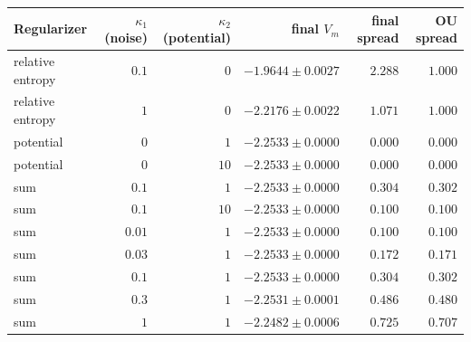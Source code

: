 \begin{tabular}{lrrrrr}
\toprule
Regularizer & $\kappa_1$ (noise) & $\kappa_2$ (potential) & final $V_m$ & final spread & OU spread \\
\midrule
relative entropy & $0.1$ & $0$ & $-1.9644\pm0.0027$ & $2.288$ & $1.000$ \\
relative entropy & $1$ & $0$ & $-2.2176\pm0.0022$ & $1.071$ & $1.000$ \\
potential & $0$ & $1$ & $-2.2533\pm0.0000$ & $0.000$ & $0.000$ \\
potential & $0$ & $10$ & $-2.2533\pm0.0000$ & $0.000$ & $0.000$ \\
sum & $0.1$ & $1$ & $-2.2533\pm0.0000$ & $0.304$ & $0.302$ \\
sum & $0.1$ & $10$ & $-2.2533\pm0.0000$ & $0.100$ & $0.100$ \\
\midrule
sum & $0.01$ & $1$ & $-2.2533\pm0.0000$ & $0.100$ & $0.100$ \\
sum & $0.03$ & $1$ & $-2.2533\pm0.0000$ & $0.172$ & $0.171$ \\
sum & $0.1$ & $1$ & $-2.2533\pm0.0000$ & $0.304$ & $0.302$ \\
sum & $0.3$ & $1$ & $-2.2531\pm0.0001$ & $0.486$ & $0.480$ \\
sum & $1$ & $1$ & $-2.2482\pm0.0006$ & $0.725$ & $0.707$ \\
\bottomrule
\end{tabular}
